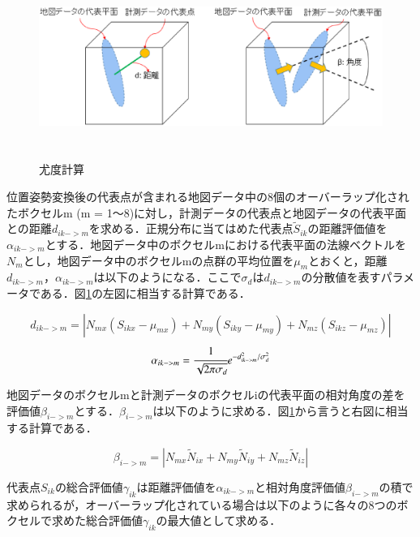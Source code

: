 \vspace{5mm}
\begin{figure}[htbp]
  \begin{center}
   \includegraphics[height=60mm]{figure/尤度計算.eps}
   \caption{尤度計算}
   \label{尤度計算}
  \end{center}
\end{figure}
%
\vspace{15mm}
位置姿勢変換後の代表点が含まれる地図データ中の8個のオーバーラップ化されたボクセルm (m = 1～8)に対し，計測データの代表点と地図データの代表平面との距離$d_{ik->m}$を求める．正規分布に当てはめた代表点$\tilde{S}_{ik}$の距離評価値を$\alpha_{ik->m}$とする．地図データ中のボクセルmにおける代表平面の法線ベクトルを$N_{m}$とし，地図データ中のボクセルmの点群の平均位置を$\mu_{m}$とおくと，距離$d_{ik->m}$，$\alpha_{ik->m}$は以下のようになる．ここで$\sigma_{d}$は$d_{ik->m}$の分散値を表すパラメータである．図{\ref{尤度計算}}の左図に相当する計算である．\par

\begin{equation}
d_{ik->m} = |N_{mx}(S_{ikx}-\mu_{mx})+N_{my}(S_{iky}-\mu_{my})+N_{mz}(S_{ikz}-\mu_{mz})|
\end{equation}
\begin{equation}
\alpha_{ik->m} = \cfrac{1}{\sqrt{2\pi\sigma_{d}}}e^{-d^2_{ik->m}/\sigma_{d}^2}
\end{equation}

地図データのボクセルmと計測データのボクセルiの代表平面の相対角度の差を評価値$\beta_{i->m}$とする．$\beta_{i->m}$は以下のように求める．図{\ref{尤度計算}}から言うと右図に相当する計算である．\par
\begin{equation}
\beta_{i->m} = |N_{mx}\tilde{N}_{ix}+N_{my}\tilde{N}_{iy}+N_{mz}\tilde{N}_{iz}|
\end{equation}

代表点$S_{ik}$の総合評価値$\gamma_{ik}$は距離評価値を$\alpha_{ik->m}$と相対角度評価値$\beta_{i->m}$の積で求められるが，オーバーラップ化されている場合は以下のように各々の8つのボクセルで求めた総合評価値$\gamma_{ik}$の最大値として求める．\par

